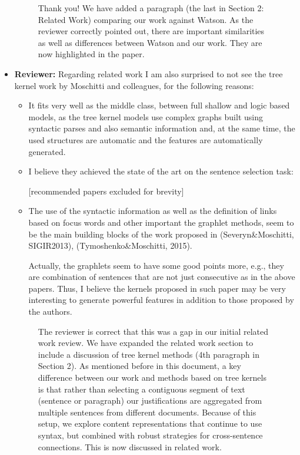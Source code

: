 \documentclass[10pt]{article}
\begin{document}
\begin{itemize}
\begin{figure}[H]
\caption{ Thank you! We have added a paragraph (the last in Section 2: Related Work) comparing our work against Watson. As the reviewer correctly pointed out, there are important similarities as well as differences between Watson and our work. They are now highlighted in the paper.  }

\end{figure}

\item \textbf{Reviewer:} Regarding related work I am also surprised to not see the tree kernel
work by Moschitti and colleagues, for the following reasons:
\begin{itemize}
        \item It fits very well as the middle class, between full shallow and logic
based models, as the tree kernel models use complex graphs built using
syntactic parses and also semantic information and, at the same time, the
used structures are automatic and the features are automatically generated.

        \item I believe they achieved the state of the art on the sentence selection
task:

  [recommended papers excluded for brevity]

        \item The use of the syntactic information as well as the definition of links
based on focus words and other important the graphlet methods, seem to be
the main building blocks of the work proposed in
(Severyn\&Moschitti, SIGIR2013), (Tymoshenko\&Moschitti, 2015).

Actually, the graphlets seem to have some good points more, e.g., they are
combination of sentences that are not just consecutive as in the above
papers. Thus, I believe the kernels proposed in such paper may be very
interesting to generate powerful features in addition to those proposed by
the authors.
\end{itemize}

\begin{figure}[H]
\caption{ The reviewer is correct that this was a gap in our initial related work review. We have expanded the related work section to include a discussion of tree kernel methods (4th paragraph in Section 2). As mentioned before in this document, a key difference between our work and methods based on tree kernels is that rather than selecting a contiguous segment of text (sentence or paragraph) our justifications are aggregated from multiple sentences from different documents. Because of this setup, we explore content representations that continue to use syntax, but combined with robust strategies for cross-sentence connections. This is now discussed in related work.}
\end{figure}


\end{itemize}
\end{document}
